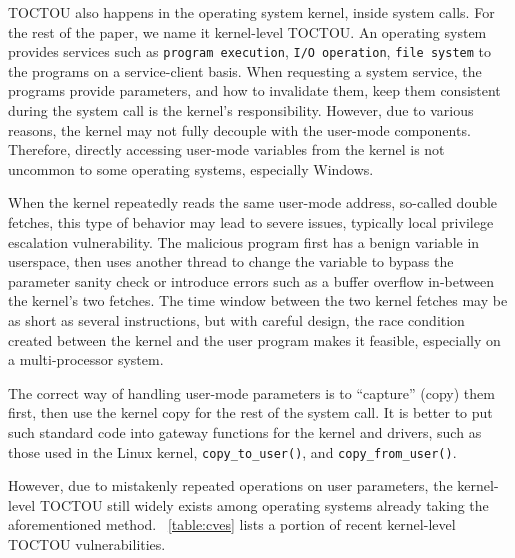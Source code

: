 TOCTOU also happens in the operating system kernel, inside system calls. For the rest of the paper, we name it kernel-level TOCTOU. An operating system provides services such as \texttt{program execution}, \texttt{I/O operation}, \texttt{file system} to the programs on a service-client basis. When requesting a system service, the programs provide parameters, and how to invalidate them, keep them consistent during the system call is the kernel's responsibility. However, due to various reasons, the kernel may not fully decouple with the user-mode components. Therefore, directly accessing user-mode variables from the kernel is not uncommon to some operating systems, especially Windows.

When the kernel repeatedly reads the same user-mode address, so-called double fetches, this type of behavior may lead to severe issues, typically local privilege escalation vulnerability. The malicious program first has a benign variable in userspace, then uses another thread to change the variable to bypass the parameter sanity check or introduce errors such as a buffer overflow in-between the kernel's two fetches. The time window between the two kernel fetches may be as short as several instructions,  but with careful design, the race condition created between the kernel and the user program makes it feasible, especially on a multi-processor system.



The correct way of handling user-mode parameters is to ``capture'' (copy) them first, then use the kernel copy for the rest of the system call. It is better to put such standard code into gateway functions for the kernel and drivers, such as those used in the Linux kernel, \texttt{copy\_to\_user()}, and \texttt{copy\_from\_user()}.

However, due to mistakenly repeated operations on user parameters, the kernel-level TOCTOU still widely exists among operating systems already taking the aforementioned method. ~\autoref{table:cves} lists a portion of recent kernel-level TOCTOU vulnerabilities.

